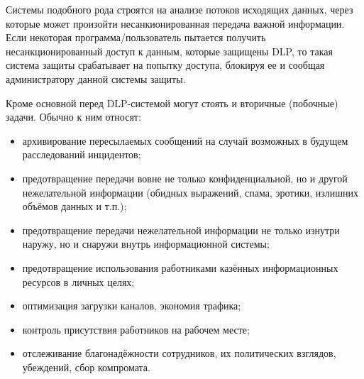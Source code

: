 Системы подобного рода строятся на анализе потоков исходящих данных, через которые может произойти несанкионированная передача важной информации. Если некоторая программа/пользователь пытается получить несанкционированный доступ к данным, которые защищены DLP, то такая система защиты срабатывает на попытку доступа, блокируя ее и сообщая администратору данной системы защиты.

Кроме основной перед DLP-системой могут стоять и вторичные (побочные) задачи. Обычно к ним относят:

\begin{itemize}
	\item
		архивирование пересылаемых сообщений на случай возможных в будущем расследований инцидентов;
	\item 
	    предотвращение передачи вовне не только конфиденциальной, но и другой нежелательной информации (обидных выражений, спама, эротики, излишних объёмов данных и т.п.);
	\item
	    предотвращение передачи нежелательной информации не только изнутри наружу, но и снаружи внутрь информационной системы;
	\item
	    предотвращение использования работниками казённых информационных ресурсов в личных целях;
	\item
	    оптимизация загрузки каналов, экономия трафика;
	\item
         контроль присутствия работников на рабочем месте;
	\item
	    отслеживание благонадёжности сотрудников, их политических взглядов, убеждений, сбор компромата.
\end{itemize}


